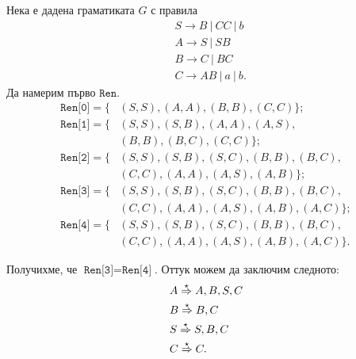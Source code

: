 \begin{extra}
\begin{multicols}{2}
    \begin{example}
      Нека е дадена граматиката $G$ с правила  
      \begin{align*}
        & S \to B\ |\ CC\ |\ b\\
        & A \to S\ |\ SB\\
        & B \to C\ |\ BC\\
        & C \to AB\ |\ a\ |\ b.
      \end{align*}
      Да намерим първо $\texttt{Ren}$.
      \begin{align*}
        \texttt{Ren[0]} = \{ & (S,S), (A,A), (B,B), (C,C)\};\\
        \texttt{Ren[1]} = \{ & (S,S), (S,B), (A,A), (A,S),\\
                             & (B,B), (B,C), (C,C)\};\\
        \texttt{Ren[2]} = \{ & (S,S),(S,B), (S,C), (B,B), (B,C),\\
                             & (C,C), (A,A), (A,S), (A,B)\};\\
        \texttt{Ren[3]} = \{ & (S,S),(S,B), (S,C), (B,B), (B,C),\\
                             & (C,C), (A,A), (A,S), (A,B), (A,C)\};\\
        \texttt{Ren[4]} = \{ & (S,S),(S,B), (S,C), (B,B), (B,C),\\
                             & (C,C), (A,A), (A,S), (A,B), (A,C)\}.
      \end{align*}
      
      Получихме, че $\texttt{Ren[3]} = \texttt{Ren[4]}$.
      Оттук можем да заключим следното:
      \begin{align*}
        & A \stackrel{{\star}}{\Rightarrow} A,B,S,C\\
        & B \stackrel{{\star}}{\Rightarrow} B,C\\
        & S \stackrel{{\star}}{\Rightarrow} S,B,C\\
        & C \stackrel{{\star}}{\Rightarrow} C.          
      \end{align*}
      

\end{example}
\end{multicols}
\end{extra}
